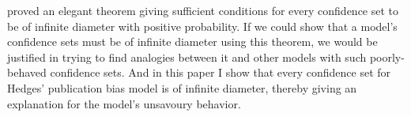 \textcite{Gleser1987-ii} proved an elegant theorem giving sufficient conditions for every confidence set to be of infinite diameter with positive probability. If we could show that a model's confidence sets must be of infinite diameter using this theorem, we would be justified in trying to find analogies between it and other models with such poorly-behaved confidence sets. And in this paper I show that every confidence set for Hedges' publication bias model is of infinite diameter, thereby giving an explanation for the model's unsavoury behavior.
